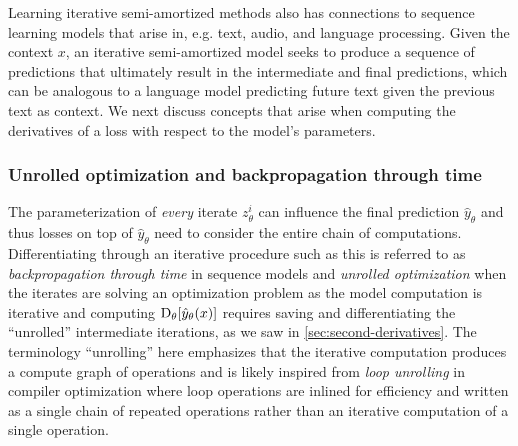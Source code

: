 \documentclass[twoside,11pt]{article}
\newcommand{\eg}{e.g.\xspace}
\begin{document}
Learning iterative semi-amortized methods also has connections to
sequence learning models that arise in, \eg text, audio,
and language processing.
Given the context $x$, an iterative semi-amortized model
seeks to produce a sequence of predictions that ultimately
result in the intermediate and final predictions,
which can be analogous to a language model predicting
future text given the previous text as context.
We next discuss concepts that arise when computing the derivatives
of a loss with respect to the model's parameters.

\subsubsection{Unrolled optimization and backpropagation through time}
\label{sec:unrolled}
\begin{center}
\end{center}
\vspace{-10mm}

The parameterization of \emph{every} iterate $z_\theta^i$ can
influence the final prediction $\hat y_\theta$ and thus
losses on top of $\hat y_\theta$ need to consider the
entire chain of computations.
Differentiating through an iterative procedure such
as this is referred to as \emph{backpropagation through time}
in sequence models and \emph{unrolled optimization}
\citep{pearlmutter2008reverse,zhang2010multi,maclaurin2015gradient,belanger2016structured,metz2016unrolled,finn2017model,han2017alternating,belanger2017end,belanger2017deep,foerster2017learning,bhardwaj2020differentiable,monga2021algorithm}
when the iterates are solving an optimization problem
as the model computation is iterative and computing
$\mathrm{D}_\theta[\hat y_\theta(x)]$
requires saving and differentiating the ``unrolled''
intermediate iterations, as we saw in \cref{sec:second-derivatives}.
The terminology ``unrolling'' here emphasizes that the
iterative computation produces a compute graph of operations
and is likely inspired from
\emph{loop unrolling} in compiler optimization
\citep{aho1986compilers,davidson1995aggressive} where
loop operations are inlined for efficiency and written
as a single chain of repeated operations rather
than an iterative computation of a single operation.
\end{document}
